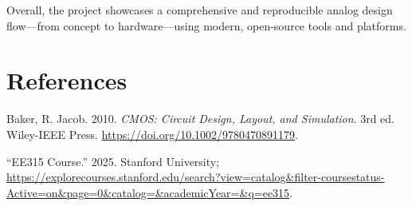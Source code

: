 \documentclass[
  letterpaper,
  DIV=11,
  numbers=noendperiod]{scrreprt}
\newlength{\cslhangindent}
\newenvironment{CSLReferences}[2] %
 {\begin{list}{}{%
  \setlength{\itemindent}{0pt}
  \setlength{\leftmargin}{0pt}
  \setlength{\parsep}{0pt}
  \ifodd #1
   \setlength{\leftmargin}{\cslhangindent}
   \setlength{\itemindent}{-1\cslhangindent}
  \fi
  \setlength{\itemsep}{#2\baselineskip}}}
 {\end{list}}
\begin{document}
Overall, the project showcases a comprehensive and reproducible analog
design flow---from concept to hardware---using modern, open-source tools
and platforms.

\chapter*{References}\label{references}

\label{refs}
\begin{CSLReferences}{1}{0}
Baker, R. Jacob. 2010. \emph{{CMOS}: Circuit Design, Layout, and
Simulation}. 3rd ed. Wiley-IEEE Press.
\url{https://doi.org/10.1002/9780470891179}.

{``EE315 Course.''} 2025. Stanford University;
\url{https://explorecourses.stanford.edu/search?view=catalog&filter-coursestatus-Active=on&page=0&catalog=&academicYear=&q=ee315}.

\end{CSLReferences}
\end{document}
